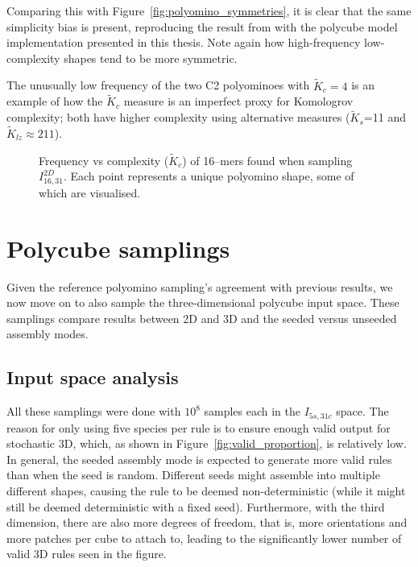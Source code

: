 Comparing this with Figure~\ref{fig:polyomino_symmetries}, it is clear that the same simplicity bias is present, reproducing the result from \cite{johnston2021} with the polycube model implementation presented in this thesis. Note again how high-frequency low-complexity shapes tend to be more symmetric.

The unusually low frequency of the two C2 polyominoes with \(\widetilde{K}_c = 4\) is an example of how the \(\widetilde{K}_c\) measure is an imperfect proxy for Komologrov complexity; both have higher complexity using alternative measures (\(\widetilde{K}_s\)=11 and \(\widetilde{K}_{lz} \approx 211\)).

\begin{figure}[h]
    \centering
    
    \caption{Frequency vs complexity (\(\widetilde{K}_c\)) of 16--mers found when sampling \(I_{16,31}^{2D}\). Each point represents a unique polyomino shape, some of which are visualised.}
    \label{fig:freq_vs_compl_refcalc}
\end{figure}



\section{Polycube samplings}
\label{sec:maincalc}



Given the reference polyomino sampling's agreement with previous results, we now move on to also sample the three-dimensional polycube input space. These samplings compare results between 2D and 3D and the seeded versus unseeded assembly modes.

\subsection{Input space analysis}
All these samplings were done with \(10^8\) samples each in the \(I_{5s,31c}\) space. The reason for only using five species per rule is to ensure enough valid output for stochastic 3D, which, as shown in Figure~\ref{fig:valid_proportion}, is relatively low. In general, the seeded assembly mode is expected to generate more valid rules than when the seed is random. Different seeds might assemble into multiple different shapes, causing the rule to be deemed non-deterministic (while it might still be deemed deterministic with a fixed seed). Furthermore, with the third dimension, there are also more degrees of freedom, that is, more orientations and more patches per cube to attach to, leading to the significantly lower number of valid 3D rules seen in the figure.

